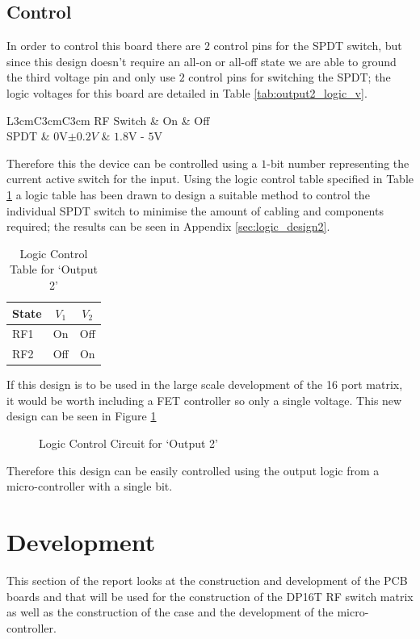 \documentclass[12pt,openany,a4paper]{book}
\begin{document}
\subsection{Control}
In order to control this board there are $2$ control pins for the SPDT switch, but since this design doesn't require an all-on or all-off state we are able to ground the third voltage pin and only use $2$ control pins for switching the SPDT; the logic voltages for this board are detailed in Table \ref{tab:output2_logic_v}.
\begin{table}[H]
	\centering
	\begin{tabular}{L{3cm}C{3cm}C{3cm}}
	\hline
	RF Switch & On & Off\\
	\hline
	SPDT & $0$V$\pm 0.2V$ & $1.8$V - $5$V \\
	\hline	
	\end{tabular}
	\caption{Logic Voltage Control}
	\label{tab:output2_logic_v}
\end{table}
Therefore this the device can be controlled using a $1$-bit number representing the current active switch for the input. Using the logic control table specified in Table \ref{tab:logic-cont-output2} a logic table has been drawn to design a suitable method to control the individual SPDT switch to minimise the amount of cabling and components required; the results can be seen in Appendix \ref{sec:logic_design2}. 
\begin{table}[H]
	\centering
	\begin{tabular}{l c c }
		\hline
		State & $V_1$ & $V_2$\\
		\hline
		RF1 & On & Off \\
		RF2 & Off & On \\
		\hline
	\end{tabular}
    \caption{Logic Control Table for `Output 2'} \label{tab:logic-cont-output2}
\end{table}
If this design is to be used in the large scale development of the 16 port matrix, it would be worth including a FET controller so only a single voltage. This new design can be seen in Figure \ref{fig:output2-control}
\begin{figure}[H]
	\centering
	\caption{Logic Control Circuit for `Output 2'}
	\label{fig:output2-control}
\end{figure} 
Therefore this design can be easily controlled using the output logic from a micro-controller with a single bit.


\section{Development}
This section of the report looks at the construction and development of the PCB boards and that will be used for the construction of the DP16T RF switch matrix as well as the construction of the case and the development of the micro-controller.
\end{document}
